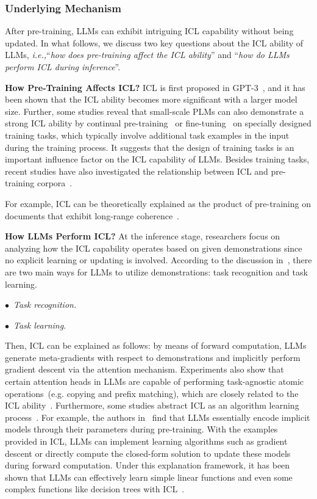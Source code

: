 {{{{{{\subsubsection{Underlying Mechanism}
\label{sec-ICL-mechanism}
After pre-training, LLMs can exhibit intriguing ICL capability without being updated. In what follows, we discuss two key questions about the ICL ability of LLMs, \emph{i.e.,}``\emph{how does pre-training affect the ICL ability}'' and ``\emph{how do LLMs perform ICL during inference}''.

\textbf{How Pre-Training Affects ICL?} ICL is first proposed in GPT-3~\cite{Brown-NeurIPS-2020-Language}, and it has been shown that the ICL ability becomes more significant with a larger model size. Further, some studies reveal that small-scale PLMs can also demonstrate a strong ICL ability by continual pre-training~\cite{Gu-arXiv-2023-Pre} or fine-tuning~\cite{Min-NAACL-2022-MetaICL} on specially designed training tasks, which typically involve additional task examples in the input during the training process. It suggests that the design of training tasks is an important influence factor on the ICL capability of LLMs. Besides training tasks, recent studies have also investigated the relationship between ICL and pre-training corpora~\cite{Michael-ICLR-2022-An, Hahn-2023-arXiv-a}.

For example, ICL can be theoretically explained as the product of pre-training on documents that exhibit long-range coherence~\cite{Michael-ICLR-2022-An}. 

\textbf{How LLMs Perform ICL?} At the inference stage, researchers focus on analyzing how the ICL capability operates based on given demonstrations since no explicit learning or updating is involved. According to the discussion in~\cite{Pan-2023-arXiv-what}, there are two main ways for LLMs to utilize demonstrations: task recognition and task learning.  

$\bullet$~\emph{Task recognition.}

$\bullet$~\emph{Task learning.}

Then, ICL can be explained as follows: by means of forward computation, LLMs generate meta-gradients with respect to demonstrations and implicitly perform gradient descent via the attention mechanism. Experiments also show that certain attention heads in LLMs are capable of performing task-agnostic atomic operations~(e.g. copying and prefix matching), which are closely related to the ICL ability~\cite{Olsson-arxiv-2022-In}. Furthermore, some studies abstract ICL as an algorithm learning process~\cite{rek-arxiv-2022-what}. For example, the authors in~\cite{rek-arxiv-2022-what} find that LLMs essentially encode implicit models through their parameters during pre-training. With the examples provided in ICL, LLMs can implement learning algorithms such as gradient descent or directly compute the closed-form solution to update these models during forward computation. Under this explanation framework, it has been shown that LLMs can effectively learn simple linear functions and even some complex functions like decision trees with ICL~\cite{rek-arxiv-2022-what}.

}}}}}}
